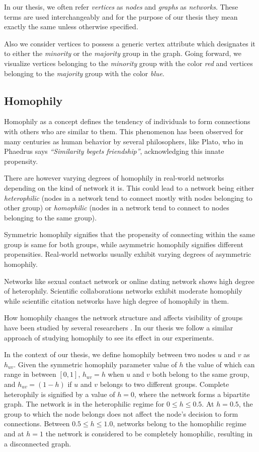 In our thesis, we often refer \textit{vertices} as \textit{nodes} and \textit{graphs} as \textit{networks}. These terms are used interchangeably and for the purpose of our thesis they mean exactly the same unless otherwise specified. 

Also we consider vertices to possess a generic vertex attribute which designates it to either the \textit{minority} or the \textit{majority} group in the graph. Going forward, we visualize vertices belonging to the \textit{minority} group with the color \textit{red} and vertices belonging to the \textit{majority} group with the color \textit{blue}.

\subsection{Homophily}
Homophily as a concept defines the tendency of individuals to form connections with others who are similar to them. This phenomenon has been observed for many centuries as human behavior by several philosophers, like Plato, who in Phaedrus \cite{hackforth1972plato} says \textit{``Similarity begets friendship''}, acknowledging this innate propensity.

There are however varying degrees of homophily in real-world networks depending on the kind of network it is. This could lead to a network being either \textit{heterophilic} (nodes in a network tend to connect mostly with nodes belonging to other group) or \textit{homophilic} (nodes in a network tend to connect to nodes belonging to the same group).

Symmetric homophily signifies that the propensity of connecting within the same group is same for both groups, while asymmetric homophily signifies different propensities. Real-world networks usually exhibit varying degrees of asymmetric homophily.

Networks like sexual contact network or online dating network shows high degree of heterophily. Scientific collaborations networks exhibit moderate homophily while scientific citation networks have high degree of homophily in them. 

How homophily changes the network structure and affects visibility of groups have been studied by several researchers \cite{stoica2018algorithmic,avin2015homophily,mcpherson2001birds,karimi2018homophily}. In our thesis we follow a similar approach of studying homophily to see its effect in our experiments. 

In the context of our thesis, we define homophily between two nodes $u$ and $v$ as $h_{uv}$. Given the symmetric homophily parameter value of $h$ the value of which can range in between $[0, 1]$, $h_{uv}=h$ when $u$ and $v$ both belong to the same group, and $h_{uv}=(1-h)$ if $u$ and $v$ belongs to two different groups. Complete heterophily is signified by a value of $h=0$, where the network forms a bipartite graph. The network is in the heterophilic regime for $0 \leq h \leq 0.5$. At $h=0.5$, the group to which the node belongs does not affect the node's decision to form connections. Between $0.5 \leq h \leq 1.0$, networks belong to the homophilic regime and at $h=1$ the network is considered to be completely homophilic, resulting in a disconnected graph.

